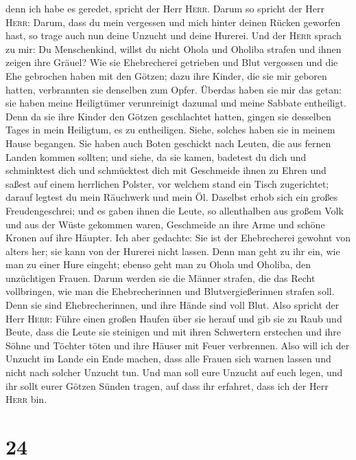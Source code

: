 denn ich habe es geredet, spricht der Herr \textsc{Herr}.
 Darum so spricht der Herr \textsc{Herr}: Darum, dass du
mein vergessen und mich hinter deinen Rücken geworfen hast, so trage
auch nun deine Unzucht und deine Hurerei.  Und der
\textsc{Herr} sprach zu mir: Du Menschenkind, willst du nicht Ohola und
Oholiba strafen und ihnen zeigen ihre Gräuel?  Wie sie
Ehebrecherei getrieben und Blut vergossen und die Ehe gebrochen haben
mit den Götzen; dazu ihre Kinder, die sie mir geboren hatten,
verbrannten sie denselben zum Opfer.  Überdas haben sie
mir das getan: sie haben meine Heiligtümer verunreinigt dazumal und
meine Sabbate entheiligt.  Denn da sie ihre Kinder den
Götzen geschlachtet hatten, gingen sie desselben Tages in mein
Heiligtum, es zu entheiligen. Siehe, solches haben sie in meinem Hause
begangen.  Sie haben auch Boten geschickt nach Leuten,
die aus fernen Landen kommen sollten; und siehe, da sie kamen, badetest
du dich und schminktest dich und schmücktest dich mit Geschmeide ihnen
zu Ehren  und saßest auf einem herrlichen Polster, vor
welchem stand ein Tisch zugerichtet; darauf legtest du mein Räuchwerk
und mein Öl.  Daselbst erhob sich ein großes
Freudengeschrei; und es gaben ihnen die Leute, so allenthalben aus
großem Volk und aus der Wüste gekommen waren, Geschmeide an ihre Arme
und schöne Kronen auf ihre Häupter.  Ich aber gedachte:
Sie ist der Ehebrecherei gewohnt von alters her; sie kann von der
Hurerei nicht lassen.  Denn man geht zu ihr ein, wie man
zu einer Hure eingeht; ebenso geht man zu Ohola und Oholiba, den
unzüchtigen Frauen.  Darum werden sie die Männer strafen,
die das Recht vollbringen, wie man die Ehebrecherinnen und
Blutvergießerinnen strafen soll. Denn sie sind Ehebrecherinnen, und ihre
Hände sind voll Blut.  Also spricht der Herr
\textsc{Herr}: Führe einen großen Haufen über sie herauf und gib sie zu
Raub und Beute,  dass die Leute sie steinigen und mit
ihren Schwertern erstechen und ihre Söhne und Töchter töten und ihre
Häuser mit Feuer verbrennen.  Also will ich der Unzucht
im Lande ein Ende machen, dass alle Frauen sich warnen lassen und nicht
nach solcher Unzucht tun.  Und man soll eure Unzucht auf
euch legen, und ihr sollt eurer Götzen Sünden tragen, auf dass ihr
erfahret, dass ich der Herr \textsc{Herr} bin.

\hypertarget{section-23}{%
\section{24}\label{section-23}}

